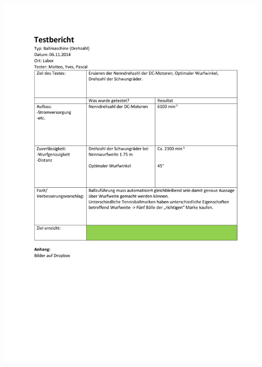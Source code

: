   	 \includegraphics[page=1,width=\textwidth]{Funktionstests/BallmaschineDrehzahl.pdf}
  	 \newpage
